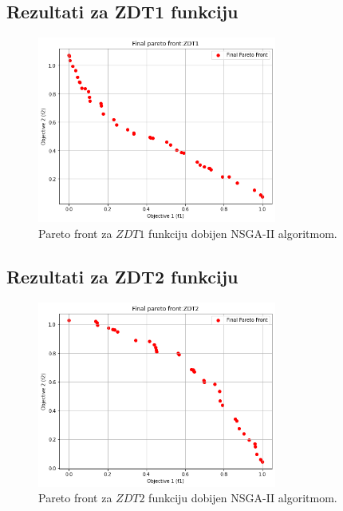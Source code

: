 \documentclass[12pt]{article}
\begin{document}
\subsection{Rezultati za ZDT1 funkciju}
\begin{figure}[H]
    \centering
    \includegraphics[width=0.7\textwidth]{images/zdt1.png}
    \caption{Pareto front za \( ZDT1 \) funkciju dobijen NSGA-II algoritmom.}
    \label{fig:zdt1_results}
\end{figure}

\subsection{Rezultati za ZDT2 funkciju}
\begin{figure}[H]
    \centering
    \includegraphics[width=0.7\textwidth]{images/zdt2.png}
    \caption{Pareto front za \( ZDT2 \) funkciju dobijen NSGA-II algoritmom.}
    \label{fig:zdt2_results}
\end{figure}
\end{document}
